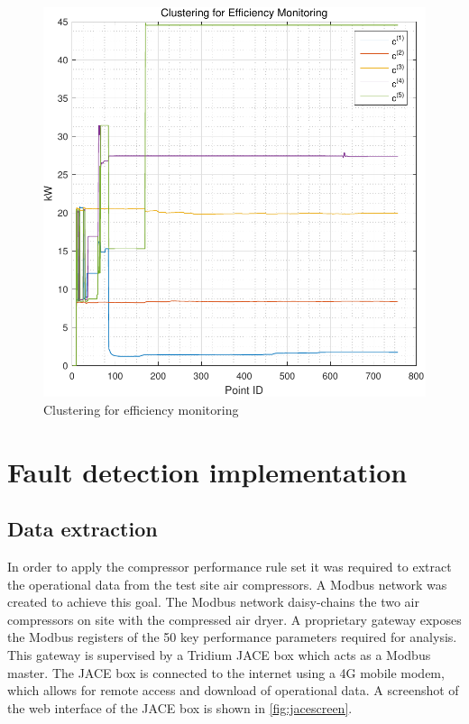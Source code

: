 \begin{figure}
\includegraphics[width = \columnwidth]{./Images/EfficiencyDegradation.pdf}
\caption{Clustering for efficiency monitoring}
\label{fig:efficiencymonitoring}
\end{figure}

\section{Fault detection implementation}
\subsection{Data extraction}
In order to apply the compressor performance rule set it was required to extract the operational data from the test site air compressors. A Modbus network was created to achieve this goal. The Modbus network daisy-chains the two air compressors on site with the compressed air dryer. A proprietary gateway exposes the Modbus registers of the 50 key performance parameters required for analysis. This gateway is supervised by a Tridium JACE box which acts as a Modbus master. The JACE box is connected to the internet using a 4G mobile modem, which allows for remote access and download of operational data. A screenshot of the web interface of the JACE box is shown in \autoref{fig:jacescreen}.

